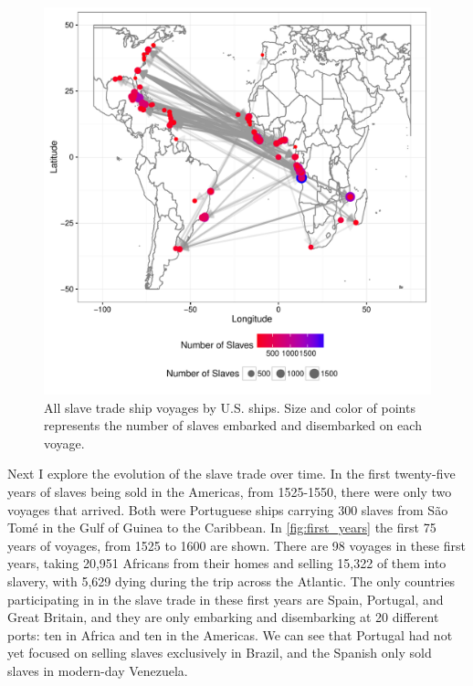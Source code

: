 \documentclass[DIV=calc, paper=a4, fontsize=10pt, twocolumn]{scrartcl}\usepackage[]{graphicx}\usepackage[]{color}
\makeatletter
\def\maxwidth{ %
  \ifdim\Gin@nat@width>\linewidth
    \linewidth
  \else
    \Gin@nat@width
  \fi
}
\newenvironment{knitrout}{}{} %
\makeatother
\begin{document}
\begin{knitrout}
\color{fgcolor}\begin{figure}[h]
\includegraphics[width=\maxwidth]{figure/slaves_usa-1} \caption[All slave trade ship voyages by U]{All slave trade ship voyages by U.S. ships. Size and color of points represents the number of slaves embarked and disembarked on each voyage.}\label{fig:slaves_usa}
\end{figure}


\end{knitrout}

\par Next I explore the evolution of the slave trade over time. In the first twenty-five years of slaves being sold in the Americas, from 1525-1550, there were only two voyages that arrived. Both were Portuguese ships carrying 300 slaves from S\~{a}o Tom\'{e} in the Gulf of Guinea to the Caribbean. In \autoref{fig:first_years} the first 75 years of voyages, from 1525 to 1600 are shown. There are 98 voyages in these first years, taking 20,951 Africans from their homes and selling 15,322 of them into slavery, with 5,629 dying during the trip across the Atlantic. The only countries participating in in the slave trade in these first years are Spain, Portugal, and Great Britain, and they are only embarking and disembarking at 20 different ports: ten in Africa and ten in the Americas. We can see that Portugal had not yet focused on selling slaves exclusively in Brazil, and the Spanish only sold slaves in modern-day Venezuela. 
\end{document}
